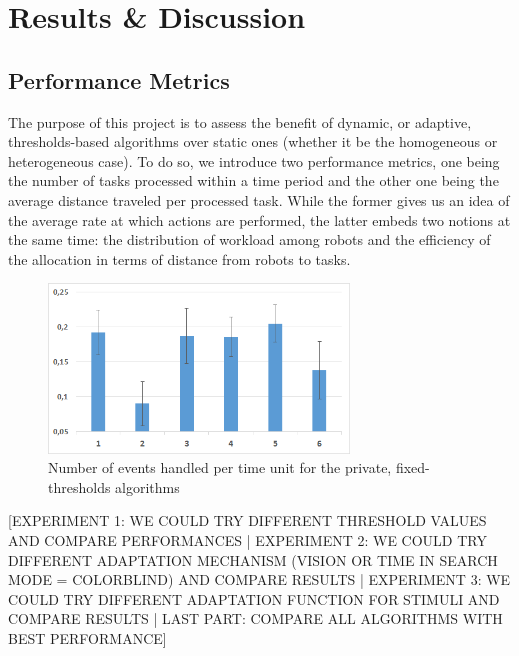 \section{Results \& Discussion}

\subsection{Performance Metrics}
The purpose of this project is to assess the benefit of dynamic, or adaptive, thresholds-based algorithms over static ones (whether it be the homogeneous or heterogeneous case). To do so, we introduce two performance metrics, one being the number of tasks processed within a time period and the other one being the average distance traveled per processed task. While the former gives us an idea of the average rate at which actions are performed, the latter embeds two notions at the same time: the distribution of workload among robots and the efficiency of the allocation in terms of distance from robots to tasks.

   \begin{figure}[thpb]
      \centering
      \includegraphics[width=8cm]{Pictures/PrivFixedMetric1.png}
      \caption{Number of events handled per time unit for the private, fixed-thresholds algorithms }
      \label{figurelabel}
   \end{figure}


[EXPERIMENT 1: WE COULD TRY DIFFERENT THRESHOLD VALUES AND COMPARE PERFORMANCES | EXPERIMENT 2: WE COULD TRY DIFFERENT ADAPTATION MECHANISM (VISION OR TIME IN SEARCH MODE = COLORBLIND) AND COMPARE RESULTS | EXPERIMENT 3: WE COULD TRY DIFFERENT ADAPTATION FUNCTION FOR STIMULI AND COMPARE RESULTS | LAST PART: COMPARE ALL ALGORITHMS WITH BEST PERFORMANCE]